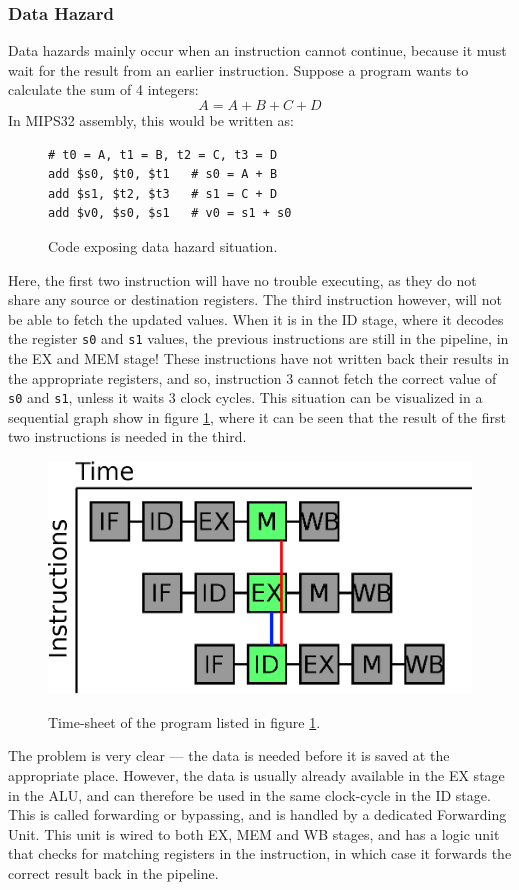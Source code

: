 \subsubsection{Data Hazard}
Data hazards mainly occur when an instruction cannot continue, because it must
wait for the result from an earlier instruction. Suppose a program wants to
calculate the sum of 4 integers:
$$A = A + B + C + D$$
In MIPS32 assembly, this would be written as:
\begin{figure}[H]
	\centering
	\begin{lstlisting}
# t0 = A, t1 = B, t2 = C, t3 = D
add $s0, $t0, $t1 	# s0 = A + B
add $s1, $t2, $t3	# s1 = C + D
add $v0, $s0, $s1	# v0 = s1 + s0
	\end{lstlisting}
	\caption{Code exposing data hazard situation.}
	\label{fig:data_hazard_code}
\end{figure}
Here, the first two instruction will have no trouble executing, as they do not
share any source or destination registers. The third instruction however, will
not be able to fetch the updated values. When it is in the ID stage, where it decodes the
register \texttt{s0} and \texttt{s1} values, the previous instructions are
still in the pipeline, in the EX and MEM stage! These instructions have not
written back their results in the appropriate registers, and so, instruction 3
cannot fetch the correct value of \texttt{s0} and \texttt{s1}, unless it waits 3 clock
cycles. This situation can be visualized in a sequential graph show in figure
\ref{fig:data_hazard_code}, where it can be seen that the result of the first
two instructions is needed in the third.\\
\begin{figure}[H]
	\centering
	\includegraphics[scale=0.4]{pipeline/data_hazard.eps}
	\label{fig:data_hazard}
	\caption{Time-sheet of the program listed in figure
\ref{fig:data_hazard_code}.}
\end{figure}
The problem is very clear --- the data is needed before it is saved at the
appropriate place. However, the data is usually already available in the EX
stage in the ALU, and can therefore be used in the same clock-cycle in the ID
stage. This is called forwarding or bypassing, and is handled by a dedicated
Forwarding Unit. This unit is wired to both EX, MEM and WB stages, and has a
logic unit that checks for matching registers in the instruction, in which case
it forwards the correct result back in the pipeline.

